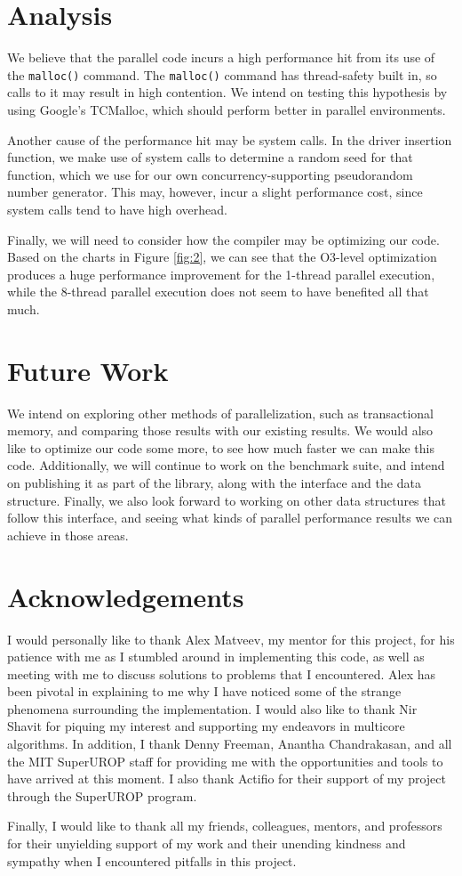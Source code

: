 \documentclass[10pt]{article}
\begin{document}
\section{Analysis}
We believe that the parallel code incurs a high performance hit from its use of the {\tt malloc()} command. The {\tt malloc()} command has thread-safety built in, so calls to it may result in high contention. We intend on testing this hypothesis by using Google's TCMalloc, which should perform better in parallel environments.

Another cause of the performance hit may be system calls. In the driver insertion function, we make use of system calls to determine a random seed for that function, which we use for our own concurrency-supporting pseudorandom number generator. This may, however, incur a slight performance cost, since system calls tend to have high overhead.

Finally, we will need to consider how the compiler may be optimizing our code. Based on the charts in Figure \ref{fig:2}, we can see that the O3-level optimization produces a huge performance improvement for the 1-thread parallel execution, while the 8-thread parallel execution does not seem to have benefited all that much.

\section{Future Work}
We intend on exploring other methods of parallelization, such as transactional memory, and comparing those results with our existing results. We would also like to optimize our code some more, to see how much faster we can make this code. Additionally, we will continue to work on the benchmark suite, and intend on publishing it as part of the library, along with the interface and the data structure. Finally, we also look forward to working on other data structures that follow this interface, and seeing what kinds of parallel performance results we can achieve in those areas.

\section{Acknowledgements}
I would personally like to thank Alex Matveev, my mentor for this project, for his patience with me as I stumbled around in implementing this code, as well as meeting with me to discuss solutions to problems that I encountered. Alex has been pivotal in explaining to me why I have noticed some of the strange phenomena surrounding the implementation. I would also like to thank Nir Shavit for piquing my interest and supporting my endeavors in multicore algorithms. In addition, I thank Denny Freeman, Anantha Chandrakasan, and all the MIT SuperUROP staff for providing me with the opportunities and tools to have arrived at this moment. I also thank Actifio for their support of my project through the SuperUROP program.

Finally, I would like to thank all my friends, colleagues, mentors, and professors for their unyielding support of my work and their unending kindness and sympathy when I encountered pitfalls in this project.



\end{document}
